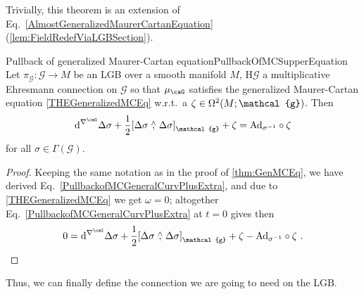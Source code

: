 \documentclass[reqno,a4paper,oneside]{amsart}
\newcommand\mutot{\mu_\caG}
\theoremstyle{plain}
\theoremstyle{remark}
\theoremstyle{definition}
\begin{document}
Trivially, this theorem is an extension of Eq.\ \eqref{AlmostGeneralizedMaurerCartanEquation} (\ref{lem:FieldRedefViaLGBSection}).

\begin{corollaries}{Pullback of generalized Maurer-Cartan equation}{PullbackOfMCSupperEquation}
Let $\pi_{\mathcal{G}} \colon \mathcal{G} \to M$ be an LGB over a smooth manifold $M$, $\mathrm{H}\mathcal{G}$ a multiplicative Ehresmann connection on $\mathcal{G}$ so that $\mutot$ satisfies the generalized Maurer-Cartan equation \eqref{THEGeneralizedMCEq} w.r.t.\ a $\zeta \in \Omega^2\mleft( M; \mathcal{g} \mright)$. Then
\begin{equation*}
\mathrm{d}^{\nabla^\caG} \Delta \sigma 
	+ \frac{1}{2} \mleft[ \Delta \sigma \stackrel{\wedge}{,} \Delta\sigma \mright]_{\mathcal{g}} 
	+ \zeta 
=
\mathrm{Ad}_{\sigma^{-1}} \circ \zeta
\end{equation*}
for all $\sigma \in \Gamma(\mathcal{G})$.
\end{corollaries}

\begin{proof}
\leavevmode\newline
Keeping the same notation as in the proof of \ref{thm:GenMCEq}, we have derived Eq.\ \eqref{PullbackofMCGeneralCurvPlusExtra}, and due to {\color{Cred2}\eqref{THEGeneralizedMCEq}} we get $\omega = 0$; altogether Eq.\ \eqref{PullbackofMCGeneralCurvPlusExtra} at $t=0$ gives then
\begin{equation*}
0
=
\mathrm{d}^{\nabla^\caG} \Delta\sigma
	+ \frac{1}{2} \mleft[ \Delta\sigma \stackrel{\wedge}{,} \Delta\sigma \mright]_{\mathcal{g}}
	+ \zeta
	- \mathrm{Ad}_{\sigma^{-1}} \circ \zeta~.
\end{equation*}
\end{proof}

Thus, we can finally define the connection we are going to need on the LGB.
\end{document}
